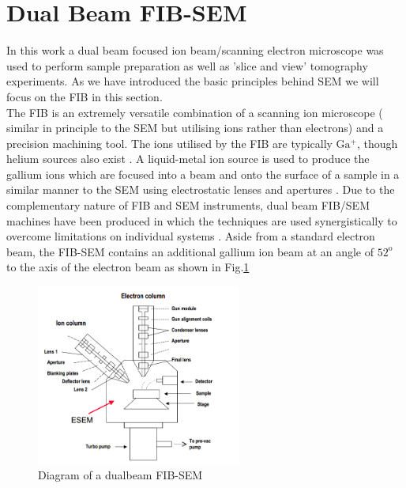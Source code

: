\section{Dual Beam FIB-SEM}

In this work a dual beam focused ion beam/scanning electron microscope   was used to perform sample preparation as well as 'slice and view' tomography experiments. As we have introduced the basic principles behind SEM we will focus on the FIB in this section.
\\ The FIB is an extremely versatile combination of a scanning ion microscope ( similar in principle to the SEM but utilising ions rather than electrons) and a precision machining tool\cite{Ishitani1996}. The ions utilised by the FIB are typically $\mathrm{Ga^{+}}$, though helium sources also exist . A liquid-metal ion source is used to produce the gallium ions which are focused into a beam and onto the surface of a sample in a similar manner to the SEM using electrostatic lenses and apertures \cite{Bals2007}. Due to the complementary nature of FIB and SEM instruments, dual beam FIB/SEM machines have been produced in which the techniques are used synergistically to overcome limitations on individual systems \cite{Bals2007}. Aside from a standard electron beam, the FIB-SEM contains an additional gallium ion beam at an angle of $\mathrm{52^{o}}$ to the axis of the electron beam as shown in Fig.\ref{2.8}

\begin{figure}[!ht]
	\centering
	\includegraphics[width=0.6\textwidth]{Figs/Ch2/FIB.png}
	\caption[h] {Diagram of a dualbeam FIB-SEM}
	\label{2.8}
\end{figure}
\FloatBarrier

